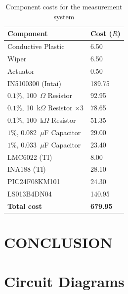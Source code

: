\documentclass[10pt,twocolumn]{witseiepaper}
\begin{document}
\begin{table}[h!]
	\caption{Component costs for the measurement system} \label{tab:cost}
	\begin{tabular}{|p{}| p{}|}
		\hline
		\textbf{Component } & \textbf{Cost ($R$)} \\ \hline
		Conductive Plastic & 6.50 \\
		Wiper &  6.50 \\
		Actuator & 0.50 \\
		IN5100300 (Intai) & 189.75 \\
		$0.1\%$, 100~$\Omega$ Resistor& 92.95 \\
		$0.1\%$, 10~k$\Omega$ Resistor $\times 3$ & 78.65  \\
		$0.1\%$, 100~k$\Omega$ Resistor & 51.35\\
		$1\%$, 0.082~$\mu$F Capacitor &  29.00 \\
		$1\%$, 0.033~$\mu$F Capacitor &  23.40\\
		LMC6022 (TI) & 8.00 \\
		INA188 (TI)&  28.10 \\
		PIC24F08KM101 & 24.30 \\
		LS013B4DN04 & 140.95 \\ \hline
		\textbf{Total cost} &  \textbf{679.95} \\ \hline
	\end{tabular}
\end{table}

\section{CONCLUSION}

\clearpage
\onecolumn
\appendix

\section{Circuit Diagrams}
\end{document}
